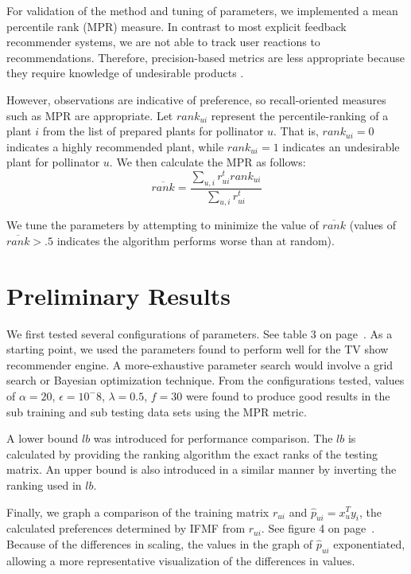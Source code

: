 \documentclass[twocolumn]{article}
\begin{document}
For validation of the method and tuning of parameters, we implemented a 
mean percentile rank (MPR) measure. In contrast to most explicit feedback
recommender systems, we are not able to track user reactions to 
recommendations. Therefore, precision-based metrics are less appropriate
because they require knowledge of undesirable products 
\cite{hu2008collaborative}.

However, observations are indicative of preference, so recall-oriented 
measures such as MPR are appropriate\cite{hu2008collaborative}. Let 
$rank_{ui}$ represent the percentile-ranking of a plant $i$ from the
list of prepared plants for pollinator $u$. That is, $rank_{ui} = 0$ 
indicates a highly recommended plant, while $rank_{ui} = 1$ indicates
an undesirable plant for pollinator $u$. We then calculate the MPR as follows:
\begin{equation}
  \overline{rank} = \dfrac
    {\sum_{u,i}r^t_{ui}rank_{ui}}
    {\sum_{u,i}r^t_{ui}}
\end{equation}

We tune the parameters by attempting to minimize the value of 
$\overline{rank}$ (values of $\overline{rank} > .5$ indicates the 
algorithm performs worse than at random)\cite{hu2008collaborative}. 

\section{Preliminary Results}

We first tested several configurations of parameters. See table 3 on page~\pageref{parest}. 
As a starting point, we used the parameters
found to perform well for the TV show recommender engine. A more-exhaustive parameter search would involve a 
grid search or Bayesian optimization technique. From the configurations tested, values of $\alpha = 20$, 
$\epsilon = 10^-8$, $\lambda = 0.5$, $f = 30$ were found to produce good results in the sub training and sub testing data sets using the MPR metric.

A lower bound $lb$ was introduced for performance comparison. The $lb$ is calculated by providing the ranking 
algorithm the exact ranks of the testing matrix. An upper bound is also introduced in a similar manner by 
inverting the ranking used in $lb$.  

Finally, we graph a comparison of the training matrix $r_{ui}$ and $\hat{p}_{ui} = x^{T}_{u}y_{i}$, the calculated
preferences determined by IFMF from $r_{ui}$. See figure 4 on page~\pageref{compgraph}. Because of the differences in scaling, the values in the graph of
$\hat{p}_{ui}$ exponentiated, allowing a more representative visualization of the differences in values. 
\end{document}
